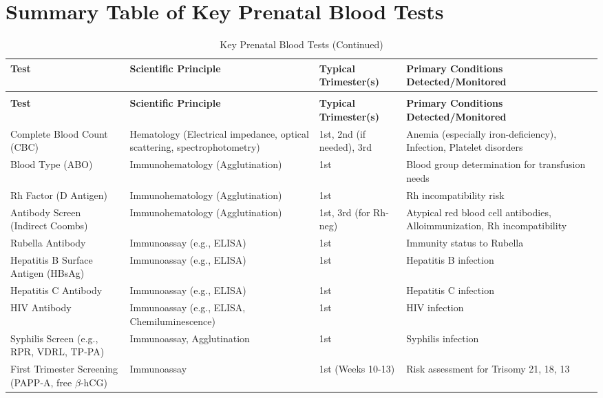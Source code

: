 \documentclass{article}
\begin{document}
\section{Summary Table of Key Prenatal Blood Tests}

\begin{longtable}{|p{3cm}|p{4.5cm}|p{3cm}|p{4.5cm}|}
\caption{Key Prenatal Blood Tests} \\
\toprule
\textbf{Test} & \textbf{Scientific Principle} & \textbf{Typical Trimester(s)} & \textbf{Primary Conditions Detected/Monitored} \\
\midrule
\endfirsthead
\caption{Key Prenatal Blood Tests (Continued)} \\
\toprule
\textbf{Test} & \textbf{Scientific Principle} & \textbf{Typical Trimester(s)} & \textbf{Primary Conditions Detected/Monitored} \\
\midrule
\endhead
\bottomrule
\endfoot
\endlastfoot
Complete Blood Count (CBC) & Hematology (Electrical impedance, optical scattering, spectrophotometry) & 1st, 2nd (if needed), 3rd & Anemia (especially iron-deficiency), Infection, Platelet disorders \\
\addlinespace
Blood Type (ABO) & Immunohematology (Agglutination) & 1st & Blood group determination for transfusion needs \\
\addlinespace
Rh Factor (D Antigen) & Immunohematology (Agglutination) & 1st & Rh incompatibility risk \\
\addlinespace
Antibody Screen (Indirect Coombs) & Immunohematology (Agglutination) & 1st, 3rd (for Rh-neg) & Atypical red blood cell antibodies, Alloimmunization, Rh incompatibility \\
\addlinespace
Rubella Antibody & Immunoassay (e.g., ELISA) & 1st & Immunity status to Rubella \\
\addlinespace
Hepatitis B Surface Antigen (HBsAg) & Immunoassay (e.g., ELISA) & 1st & Hepatitis B infection \\
\addlinespace
Hepatitis C Antibody & Immunoassay (e.g., ELISA) & 1st & Hepatitis C infection \\
\addlinespace
HIV Antibody & Immunoassay (e.g., ELISA, Chemiluminescence) & 1st & HIV infection \\
\addlinespace
Syphilis Screen (e.g., RPR, VDRL, TP-PA) & Immunoassay, Agglutination & 1st & Syphilis infection \\
\addlinespace
First Trimester Screening (PAPP-A, free \(\beta\)-hCG) & Immunoassay & 1st (Weeks 10-13) & Risk assessment for Trisomy 21, 18, 13 \\

\end{longtable}
\end{document}
